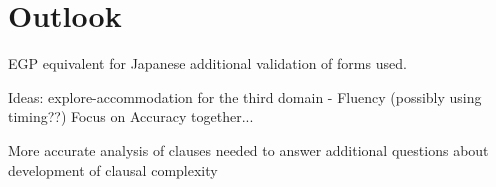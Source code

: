 \chapter{Outlook}
%
EGP equivalent for Japanese additional validation of forms used.

Ideas: explore-accommodation for the third domain - Fluency (possibly using timing??)  Focus on Accuracy together...

More accurate analysis of clauses needed to answer additional questions about development of clausal complexity